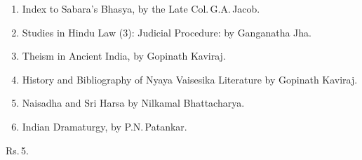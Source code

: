 \documentclass[11pt, openany]{book}
\begin{document}
\begin{sloppypar}
\begin{enumerate}[\indent(a)]
\setlength{\itemsep}{0pt}
\setlength{\parskip}{0pt}
\item Index to Sabara's Bhasya, by the Late Col.\,G.A.\,Jacob.
\item Studies in Hindu Law (3): Judicial Procedure: by Ganganatha Jha.
\item Theism in Ancient India, by Gopinath Kaviraj.
\item History and Bibliography of Nyaya Vaisesika Literature by Gopinath Kaviraj.
\item Naisadha and Sri Harsa by Nilkamal Bhattacharya.
\item Indian Dramaturgy, by P.N.\,Patankar.
\end{enumerate}
\vspace{-4mm}

\hfill Rs.\,5.
\end{sloppypar}

\newpage
\renewcommand{\thepage}{\arabic{page}}
\setcounter{page}{2}
\end{document}
